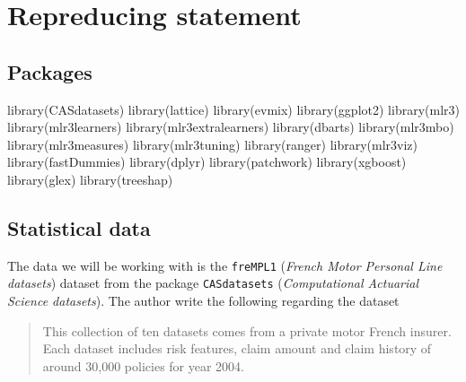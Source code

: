 \documentclass[
]{article}
\newenvironment{Shaded}{\begin{snugshade}}{\end{snugshade}}
\newcommand{\FunctionTok}[1]{\textcolor[rgb]{0.00,0.00,0.00}{#1}}
\newcommand{\NormalTok}[1]{#1}
\begin{document}
\newpage

\hypertarget{repreducing-statement}{%
\section{Repreducing statement}\label{repreducing-statement}}

\hypertarget{packages}{%
\subsection{Packages}\label{packages}}

\begin{Shaded}
\begin{Highlighting}[]
\FunctionTok{library}\NormalTok{(CASdatasets)}
\FunctionTok{library}\NormalTok{(lattice)}
\FunctionTok{library}\NormalTok{(evmix)}
\FunctionTok{library}\NormalTok{(ggplot2)}
\FunctionTok{library}\NormalTok{(mlr3)}
\FunctionTok{library}\NormalTok{(mlr3learners)}
\FunctionTok{library}\NormalTok{(mlr3extralearners)}
\FunctionTok{library}\NormalTok{(dbarts)}
\FunctionTok{library}\NormalTok{(mlr3mbo)}
\FunctionTok{library}\NormalTok{(mlr3measures)}
\FunctionTok{library}\NormalTok{(mlr3tuning)}
\FunctionTok{library}\NormalTok{(ranger)}
\FunctionTok{library}\NormalTok{(mlr3viz)}
\FunctionTok{library}\NormalTok{(fastDummies)}
\FunctionTok{library}\NormalTok{(dplyr)}
\FunctionTok{library}\NormalTok{(patchwork)}
\FunctionTok{library}\NormalTok{(xgboost)}
\FunctionTok{library}\NormalTok{(glex)}
\FunctionTok{library}\NormalTok{(treeshap)}
\end{Highlighting}
\end{Shaded}

\hypertarget{statistical-data}{%
\subsection{Statistical data}\label{statistical-data}}

The data we will be working with is the \texttt{freMPL1} (\emph{French
Motor Personal Line datasets}) dataset from the package
\texttt{CASdatasets} (\emph{Computational Actuarial Science datasets}).
The author write the following regarding the dataset

\begin{quote}
This collection of ten datasets comes from a private motor French
insurer. Each dataset includes risk features, claim amount and claim
history of around 30,000 policies for year 2004.
\end{quote}
\end{document}
